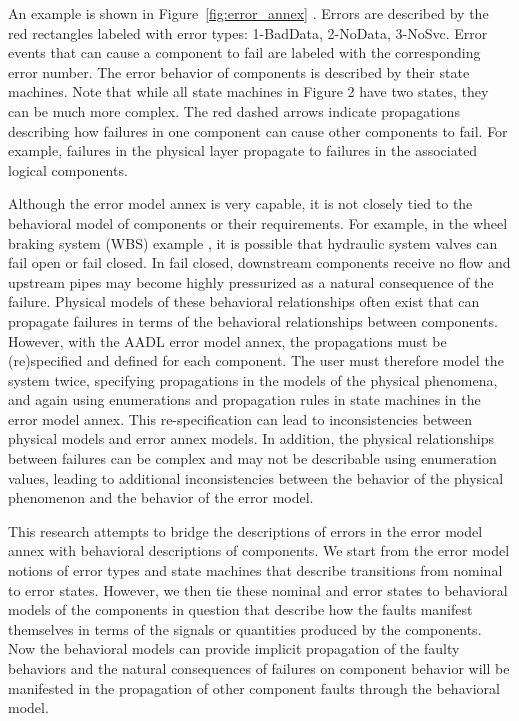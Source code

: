 An example is shown in Figure~\ref{fig:error_annex}  . Errors are described by the red rectangles labeled with error types: 1-BadData, 2-NoData, 3-NoSvc. Error events that can cause a component to fail are labeled with the corresponding error number. The error behavior of components is described by their state machines. Note that while all state machines in Figure 2 have two states, they can be much more complex. The red dashed arrows indicate propagations describing how failures in one component can cause other components to fail. For example, failures in the physical layer propagate to failures in the associated logical components.

Although the error model annex is very capable, it is not closely tied to the behavioral model of components or their requirements. For example, in the wheel braking system (WBS) example \cite{AIR6110}, it is possible that hydraulic system valves can fail open or fail closed. In fail closed, downstream components receive no flow and upstream pipes may become highly pressurized as a natural consequence of the failure. Physical models of these behavioral relationships often exist that can propagate failures in terms of the behavioral relationships between components. However, with the AADL error model annex, the propagations must be (re)specified and defined for each component. The user must therefore model the system twice, specifying propagations in the models of the physical phenomena, and again using enumerations and propagation rules in state machines in the error model annex. This re-specification can lead to inconsistencies between physical models and error annex models. In addition, the physical relationships between failures can be complex and may not be describable using enumeration values, leading to additional inconsistencies between the behavior of the physical phenomenon and the behavior of the error model.

This research attempts to bridge the descriptions of errors in the error model annex with behavioral descriptions of components. We start from the error model notions of error types and state machines that describe transitions from nominal to error states. However, we then tie these nominal and error states to behavioral models of the components in question that describe how the faults manifest themselves in terms of the signals or quantities produced by the components. Now the behavioral models can provide implicit propagation of the faulty behaviors and the natural consequences of failures on component behavior will be manifested in the propagation of other component faults through the behavioral model.

